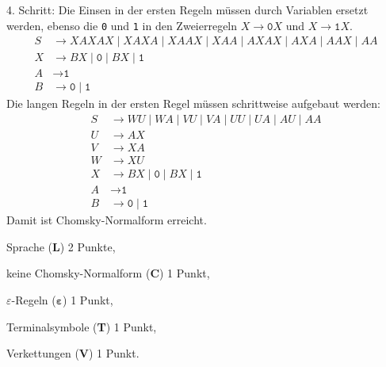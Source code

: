 \begin{loesung}
\begin{teilaufgaben}
4. Schritt: Die Einsen in der ersten Regeln müssen durch Variablen
ersetzt werden, ebenso die \texttt{0} und \texttt{1} in den Zweierregeln
$X\to\texttt{0}X$ und $X\to\texttt{1}X$.
\begin{align*}
S & \to XAXAX \mid  XAXA \mid  XAAX \mid  XAA \mid  AXAX \mid  AXA  \mid  AAX \mid  AA  
\\
X & \to
BX
\mid 
\texttt{0}
\mid 
BX
\mid 
\texttt{1}
\\
A&\to \texttt{1}
\\
B&\to \texttt{0} \mid  \texttt{1}
\end{align*}
Die langen Regeln in der ersten Regel müssen schrittweise aufgebaut werden:
\begin{align*}
S & \to WU \mid  WA \mid  VU \mid  VA \mid  UU \mid  UA  \mid  AU \mid  AA  
\\
U & \to AX
\\
V & \to XA
\\
W & \to XU
\\
X & \to
BX
\mid 
\texttt{0}
\mid 
BX
\mid 
\texttt{1}
\\
A&\to \texttt{1}
\\
B&\to \texttt{0} \mid  \texttt{1}
\end{align*}
Damit ist Chomsky-Normalform erreicht.
\qedhere
\end{teilaufgaben}
\end{loesung}

\begin{bewertung}
\begin{teilaufgaben}
\item Sprache ({\bf L}) 2 Punkte,
\item keine Chomsky-Normalform ({\bf C}) 1 Punkt,
\item $\varepsilon$-Regeln ({$\mathbf{\varepsilon}$}) 1 Punkt,
\item Terminalsymbole ({\bf T}) 1 Punkt,
\item Verkettungen ({\bf V}) 1 Punkt.
\end{teilaufgaben}
\end{bewertung}

